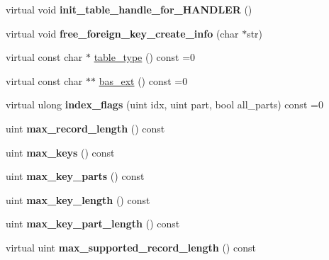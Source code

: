 \begin{DoxyCompactItemize}
\mbox{\label{classhandler_a28dfb73f9401996a25b9cf925db74149}} 
virtual void {\bfseries init\+\_\+table\+\_\+handle\+\_\+for\+\_\+\+H\+A\+N\+D\+L\+ER} ()
\item 
\mbox{\label{classhandler_aa4457d47baa6d136af65e041da4fe9e0}} 
virtual void {\bfseries free\+\_\+foreign\+\_\+key\+\_\+create\+\_\+info} (char $\ast$str)
\item 
virtual const char $\ast$ \mbox{\hyperlink{classhandler_ad38f5d3f1e026a0af32b5542aa5ac2f9}{table\+\_\+type}} () const =0
\item 
virtual const char $\ast$$\ast$ \mbox{\hyperlink{classhandler_a748d5e5b6dbbb0681cbac2ad881505c9}{bas\+\_\+ext}} () const =0
\item 
\mbox{\label{classhandler_a612375d87a4cbb6e7c190ea7d05cf945}} 
virtual ulong {\bfseries index\+\_\+flags} (uint idx, uint part, bool all\+\_\+parts) const =0
\item 
\mbox{\label{classhandler_a7ee9c5a03956913d75de1fca3af7833a}} 
uint {\bfseries max\+\_\+record\+\_\+length} () const
\item 
\mbox{\label{classhandler_a493c1ac62569e6cc89cbfde66fea47f3}} 
uint {\bfseries max\+\_\+keys} () const
\item 
\mbox{\label{classhandler_a1adabba96b635533f31d5e38e6d2a74c}} 
uint {\bfseries max\+\_\+key\+\_\+parts} () const
\item 
\mbox{\label{classhandler_a9e1b1d6fe7e717fe234c18915cb26e87}} 
uint {\bfseries max\+\_\+key\+\_\+length} () const
\item 
\mbox{\label{classhandler_a4fa0c2a89e52a27667973c1d5074dca7}} 
uint {\bfseries max\+\_\+key\+\_\+part\+\_\+length} () const
\item 
\mbox{\label{classhandler_a672a498859c2d47448100e5e703622bb}} 
virtual uint {\bfseries max\+\_\+supported\+\_\+record\+\_\+length} () const
\item 
\mbox{\label{classhandler_a9c7b335988ea24ea8b685c4278442cf8}} 
$$
\end{DoxyCompactItemize}
